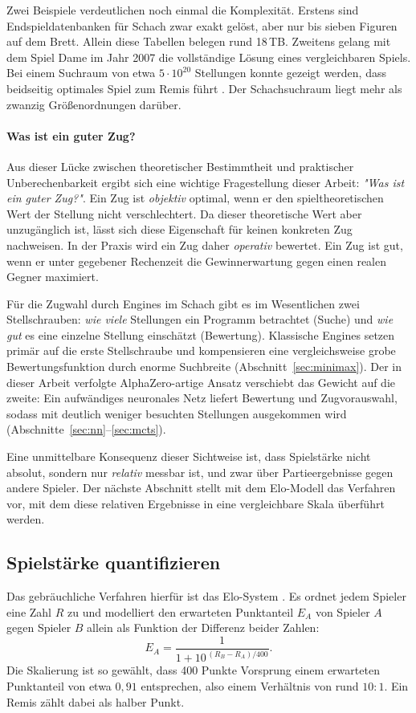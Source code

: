 \documentclass[
  a4paper, 12pt,
  parskip=half,
  headings=small,
  bibliography=totoc
]{scrartcl}
\begin{document}
Zwei Beispiele verdeutlichen noch einmal die Komplexität. Erstens sind Endspieldatenbanken für Schach zwar exakt gelöst, aber nur bis sieben Figuren auf dem Brett. Allein diese Tabellen belegen rund 18\,TB. Zweitens gelang mit dem Spiel Dame im Jahr 2007 die vollständige Lösung eines vergleichbaren Spiels. Bei einem Suchraum von etwa \(5\cdot10^{20}\) Stellungen konnte gezeigt werden, dass beidseitig optimales Spiel zum Remis führt \autocite{schaeffer2007}. Der Schachsuchraum liegt mehr als zwanzig Größenordnungen darüber.

\paragraph{Was ist ein guter Zug?}
Aus dieser Lücke zwischen theoretischer Bestimmtheit und praktischer Unberechenbarkeit ergibt sich eine wichtige Fragestellung dieser Arbeit: \emph{"Was ist ein guter Zug?"}. Ein Zug ist \emph{objektiv} optimal, wenn er den spieltheoretischen Wert der Stellung nicht verschlechtert. Da dieser theoretische Wert aber unzugänglich ist, lässt sich diese Eigenschaft für keinen konkreten Zug nachweisen. In der Praxis wird ein Zug daher \emph{operativ} bewertet. Ein Zug ist gut, wenn er unter gegebener Rechenzeit die Gewinnerwartung gegen einen realen Gegner maximiert.
 
Für die Zugwahl durch Engines im Schach gibt es im Wesentlichen zwei Stellschrauben: \emph{wie viele} Stellungen ein Programm betrachtet (Suche) und \emph{wie gut} es eine einzelne Stellung einschätzt (Bewertung). Klassische Engines setzen primär auf die erste Stellschraube und kompensieren eine vergleichsweise grobe Bewertungsfunktion durch enorme Suchbreite (Abschnitt~\ref{sec:minimax}). Der in dieser Arbeit verfolgte AlphaZero-artige Ansatz verschiebt das Gewicht auf die zweite: Ein aufwändiges neuronales Netz liefert Bewertung und Zugvorauswahl, sodass mit deutlich weniger besuchten Stellungen ausgekommen wird (Abschnitte~\ref{sec:nn}--\ref{sec:mcts}).
 
Eine unmittelbare Konsequenz dieser Sichtweise ist, dass Spielstärke nicht absolut, sondern nur \emph{relativ} messbar ist, und zwar über Partieergebnisse gegen andere Spieler. Der nächste Abschnitt stellt mit dem Elo-Modell das Verfahren vor, mit dem diese relativen Ergebnisse in eine vergleichbare Skala überführt werden.
 
\subsection{Spielstärke quantifizieren}\label{sec:elo}             %
Das gebräuchliche Verfahren hierfür ist das Elo-System \parencite{elo1978}. Es ordnet jedem Spieler eine Zahl \(R\) zu und modelliert den erwarteten Punktanteil \(E_A\) von Spieler \(A\) gegen Spieler \(B\) allein als Funktion der Differenz beider Zahlen:
\[
  E_A = \frac{1}{1 + 10^{\,(R_B - R_A)/400}}.
\]
Die Skalierung ist so gewählt, dass 400 Punkte Vorsprung einem erwarteten Punktanteil von etwa \(0{,}91\) entsprechen, also einem Verhältnis von rund \(10:1\). Ein Remis zählt dabei als halber Punkt.
 
\end{document}
